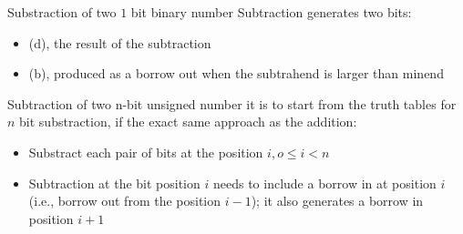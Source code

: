 \begin{parag}{Substraction of two $1$ bit binary number}
    Subtraction generates two bits:
    \begin{itemize}
        \item {} (d), the result of the subtraction
        \item {} (b), produced as a borrow out when the subtrahend is larger than minend
    \end{itemize}
\end{parag}
\begin{parag}{Subtraction of two n-bit unsigned number}
    it is  to start from the truth tables for $n$ bit substraction, if the exact same approach as the addition:
    \begin{itemize}
        \item Substract each pair of bits at the position $i, o \leq i < n$
        \item Subtraction at the bit position $i$ needs to include a borrow in at position $i$ (i.e., borrow out from the position $i - 1$); it also generates a borrow in position $i + 1$
    \end{itemize}

\end{parag}
